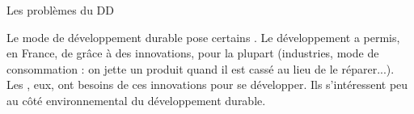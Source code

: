 \documentclass{beamer}
\begin{document}
\begin{frame}{Les problèmes du DD}



\end{frame}

\begin{frame}
Le mode de développement durable pose certains . Le développement a permis, en France, de  grâce à des innovations, pour la plupart  (industries, mode de consommation : on jette un produit quand il est cassé au lieu de le réparer...). Les , eux, ont besoins de ces innovations pour se développer. Ils s’intéressent peu au côté environnemental du développement durable.
\end{frame}

  
\end{document}
